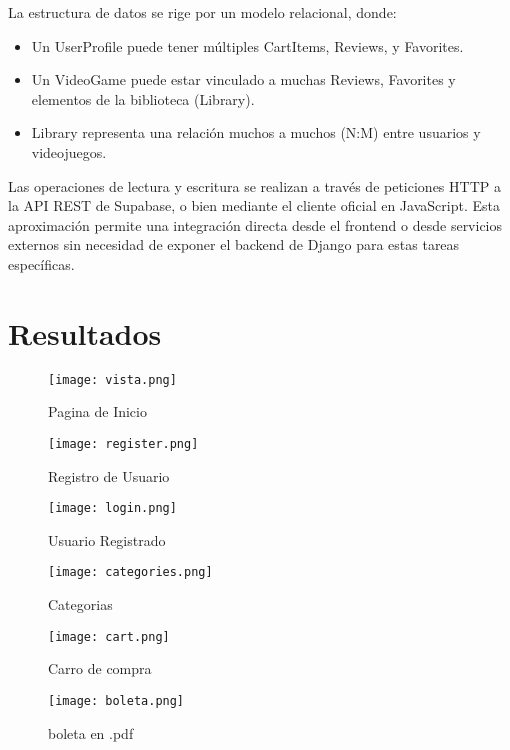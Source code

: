 \documentclass[conference]{IEEEtran}
\begin{document}
La estructura de datos se rige por un modelo relacional, donde:
\begin{itemize}
	\item Un UserProfile puede tener múltiples CartItems, Reviews, y Favorites.
	\item Un VideoGame puede estar vinculado a muchas Reviews, Favorites y elementos de la biblioteca (Library).
	\item Library representa una relación muchos a muchos (N:M) entre usuarios y videojuegos.
\end{itemize}

Las operaciones de lectura y escritura se realizan a través de peticiones HTTP a la API REST de Supabase, o bien mediante el cliente oficial en JavaScript. Esta aproximación permite una integración directa desde el frontend o desde servicios externos sin necesidad de exponer el backend de Django para estas tareas específicas.


\section{Resultados}

\begin{figure}[htbp]
	\centerline{\texttt{[image: vista.png]}}
	\caption{Pagina de Inicio}
	\label{fig}
\end{figure}

\begin{figure}[htbp]
	\centerline{\texttt{[image: register.png]}}
	\caption{Registro de Usuario}
	\label{fig}
\end{figure}

\begin{figure}[htbp]
	\centerline{\texttt{[image: login.png]}}
	\caption{Usuario Registrado}
	\label{fig}
\end{figure}

\begin{figure}[htbp]
	\centerline{\texttt{[image: categories.png]}}
	\caption{Categorias}
	\label{fig}
\end{figure}

\begin{figure}[htbp]
	\centerline{\texttt{[image: cart.png]}}
	\caption{Carro de compra}
	\label{fig}
\end{figure}

\begin{figure}[htbp]
	\centerline{\texttt{[image: boleta.png]}}
	\caption{boleta en .pdf}
	\label{fig}
\end{figure}
\end{document}
